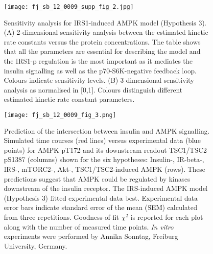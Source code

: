 \begin{figure}[tb]
	\begin{center}
		\texttt{[image: fj\_sb\_12\_0009\_supp\_fig\_2.jpg]}
		\caption[Sensitivity analysis for IRS1-induced AMPK model (Hypothesis 3)]{Sensitivity analysis for IRS1-induced AMPK model (Hypothesis 3). (A) 2-dimensional sensitivity analysis between the estimated kinetic rate constants versus the protein concentrations. The table shows that all the parameters are essential for describing the model and the IRS1-p regulation is the most important as it mediates the insulin signalling as well as the p70-S6K-negative feedback loop. Colours indicate sensitivity levels. (B) 3-dimensional sensitivity analysis as normalised in [0,1]. Colours distinguish different estimated kinetic rate constant parameters.}
		\label{fig:fj_sb_12_0009_supp_fig_2}
	\end{center}
\end{figure}
\clearpage

\begin{figure}[tb]
	\begin{center}
		\texttt{[image: fj\_sb\_12\_0009\_fig\_3.png]}
		\caption[Prediction of the intersection between insulin and AMPK signalling]{Prediction of the intersection between insulin and AMPK signalling. Simulated time courses (red lines) versus experimental data (blue points) for AMPK-pT172 and its downstream readout TSC1/TSC2-pS1387 (columns) shown for the six hypotheses: Insulin-, IR-beta-, IRS-, mTORC2-, Akt-, TSC1/TSC2-induced AMPK (rows). These predictions suggest that AMPK could be regulated by kinases downstream of the insulin receptor. The IRS-induced AMPK model (Hypothesis 3) fitted experimental data best. Experimental data error bars indicate standard error of the mean (SEM) calculated from three repetitions. Goodness-of-fit $\chi^2$ is reported for each plot along with the number of measured time points. \emph{In vitro} experiments were performed by Annika Sonntag, Freiburg University, Germany.}
		\label{fig:fj_sb_12_0009_fig_3}
	\end{center}
\end{figure}
\clearpage

